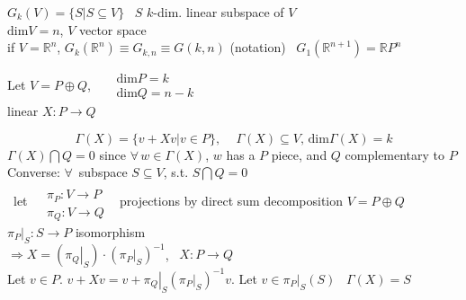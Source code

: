 




$G_k(V) = \lbrace S | S \subseteq V \rbrace$ \quad \, $S$ $k$-dim. linear subspace of $V$ \\
$\text{dim}V = n$, $V$ vector space  \\

if $V = \mathbb{R}^n$, $G_k(\mathbb{R}^n) \equiv G_{k,n} \equiv G(k,n)$ (notation) \quad \, $G_1(\mathbb{R}^{n+1}) = \mathbb{R}P^n$

Let $V = P \oplus Q$, \, $\begin{aligned}
  & \text{dim}P =k \\
  & \text{dim}Q = n-k \end{aligned}$ \\

linear $X: P \to Q$ 

\[
\Gamma(X) = \lbrace v + Xv | v \in P \rbrace , \quad \, \Gamma(X) \subseteq V, \, \text{dim}\Gamma(X) = k
\]
$\Gamma(X) \bigcap Q = 0$ since $\forall \, w \in \Gamma(X)$, $w$ has a $P$ piece, and $Q$ complementary to $P$ \\

Converse: $\forall \, $ subspace $S \subseteq V$, s.t. $S\bigcap Q = 0$ \\
\quad \, let $\begin{aligned}
  & \quad \\ 
  & \pi_P : V \to P \\ 
  & \pi_Q: V \to Q
\end{aligned}$ \quad \, projections by direct sum decomposition $V = P\oplus Q$ \\

$\left. \pi_P \right|_S : S \to P$ isomorphism  \\
$\Longrightarrow X = ( \left. \pi_Q \right|_S ) \cdot ( \left. \pi_P \right|_S)^{-1}$, \, $X: P \to Q$ \\

Let $v\in P$.  $v+ Xv = v +  \left. \pi_Q \right|_S (  \left. \pi_P \right|_S)^{-1} v$.  Let $v  \in \left. \pi_P \right|_S (S)$ \quad \, $\Gamma(X) = S$ \\


